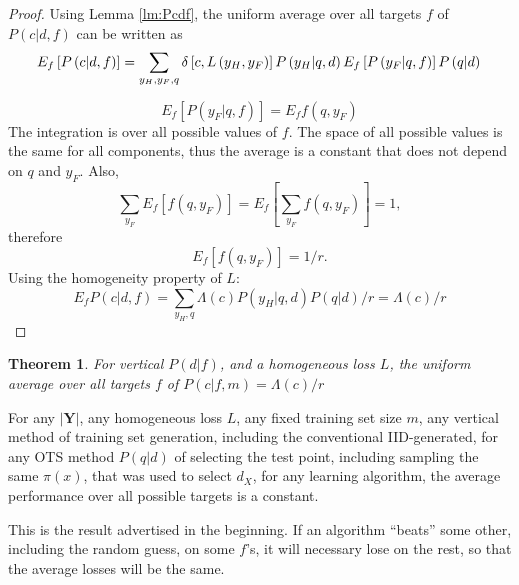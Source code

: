 \documentclass[a4paper]{article}
\newtheorem{theorem}{Theorem}[section]
\begin{document}
\begin{proof}
  Using Lemma \ref{lm:Pcdf}, the uniform average over all targets $f$
  of $P\left(c|d,f\right)$ can be written as
  \begin{equation}
    E_f \left[P\left(c|d,f\right)\right] = \sum_{y_H,y_F,q}
      \delta\left[c,L\left(y_H, y_F\right)\right]
      P\left(y_H|q,d\right) E_f \left[P\left(y_F|q,f\right)\right] P\left(q|d\right) \\
  \end{equation}

  \begin{equation}
    E_f \left[P\left(y_F|q,f\right)\right] = E_f f(q,y_F)
  \end{equation}
  The integration is over all possible values of $f$. The space of all
  possible values is the same for all components, thus the average is
  a constant that does not depend on $q$ and $y_F$. Also,
  \begin{equation}
    \sum_{y_F} E_f\left[f(q, y_F)\right] = E_f\left[\sum_{y_F} f(q, y_F)\right] = 1,  
  \end{equation}
  therefore
  \begin{equation}
    E_f\left[f(q, y_F)\right] = 1/r.
  \end{equation}
  Using the homogeneity property of $L$:
  \begin{equation}
    E_f P\left(c|d,f\right) = \sum_{y_H, q} \Lambda(c)
    P\left(y_H|q,d\right)  P\left(q|d\right) / r = \Lambda(c)/r
  \end{equation}
\end{proof}

\begin{theorem}
  For vertical $P\left(d|f\right)$, and a homogeneous loss $L$, the
  uniform average over all targets $f$ of
  $P\left(c|f, m\right) = \Lambda(c)/r$
  \label{th:Pcfm}
\end{theorem}

For any $\left|\mathbf{Y}\right|$, any homogeneous loss $L$, any fixed
training set size $m$, any vertical method of training set generation,
including the conventional IID-generated, for any OTS method $P(q|d)$
of selecting the test point, including sampling the same $\pi(x)$,
that was used to select $d_X$, for any learning algorithm, the average
performance over all possible targets is a constant.

This is the result advertised in the beginning. If an algorithm
``beats'' some other, including the random guess, on some $f$'s, it
will necessary lose on the rest, so that the average losses will be
the same.
\end{document}
